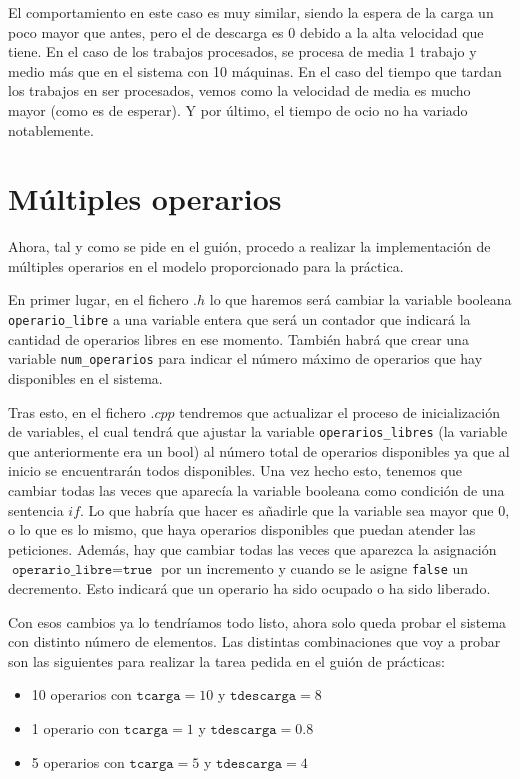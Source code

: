 \documentclass[11pt,a4paper]{report}
\begin{document}
El comportamiento en este caso es muy similar, siendo la espera de la carga un poco mayor que antes, pero el de descarga es 0 debido a la alta velocidad que tiene. En el caso de los trabajos procesados, se procesa de media 1 trabajo y medio más que en el sistema con 10 máquinas. En el caso del tiempo que tardan los trabajos en ser procesados, vemos como la velocidad de media es mucho mayor (como es de esperar). Y por último, el tiempo de ocio no ha variado notablemente.

\newpage
\section{Múltiples operarios}

Ahora, tal y como se pide en el guión, procedo a realizar la implementación de múltiples operarios en el modelo proporcionado para la práctica.

En primer lugar, en el fichero $.h$ lo que haremos será cambiar la variable booleana \texttt{operario\_libre} a una variable entera que será un contador que indicará la cantidad de operarios libres en ese momento. También habrá que crear una variable \texttt{num\_operarios} para indicar el número máximo de operarios que hay disponibles en el sistema.
 
Tras esto, en el fichero $.cpp$ tendremos que actualizar el proceso de inicialización de variables, el cual tendrá que ajustar la variable \texttt{operarios\_libres} (la variable que anteriormente era un bool) al número total de operarios disponibles ya que al inicio se encuentrarán todos disponibles. Una vez hecho esto, tenemos que cambiar todas las veces que aparecía la variable booleana como condición de una sentencia $if$. Lo que habría que hacer es añadirle que la variable sea mayor que 0, o lo que es lo mismo, que haya operarios disponibles que puedan atender las peticiones. Además, hay que cambiar todas las veces que aparezca la asignación $\texttt{operario\_libre} = \texttt{true}$ por un incremento y cuando se le asigne \texttt{false} un decremento. Esto indicará que un operario ha sido ocupado o ha sido liberado.

Con esos cambios ya lo tendríamos todo listo, ahora solo queda probar el sistema con distinto número de elementos. Las distintas combinaciones que voy a probar son las siguientes para realizar la tarea pedida en el guión de prácticas:

\begin{itemize}
	\item{10 operarios con $\texttt{tcarga} = 10$ y $\texttt{tdescarga} = 8$}
	\item{1 operario con $\texttt{tcarga} = 1$ y $\texttt{tdescarga} = 0.8$}
	\item{5 operarios con $\texttt{tcarga} = 5$ y $\texttt{tdescarga} = 4$}
\end{itemize}
\end{document}
